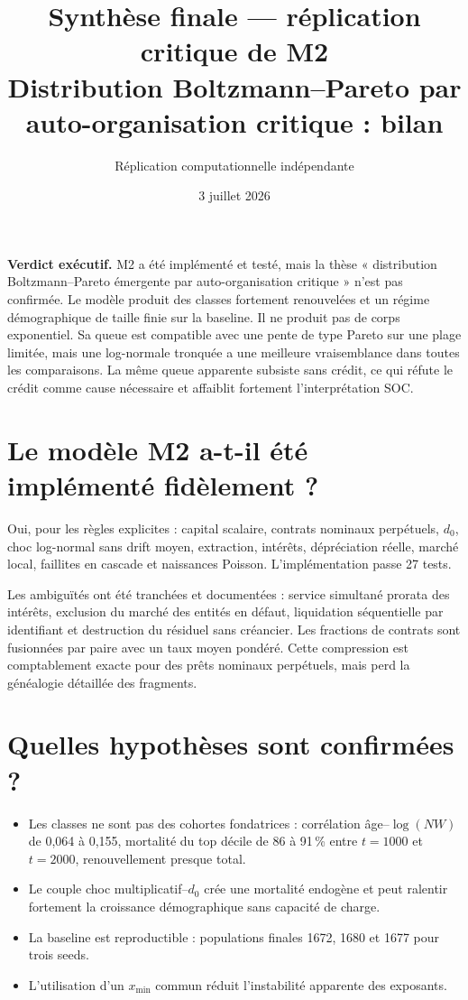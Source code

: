\documentclass[11pt,a4paper]{article}
\title{Synthèse finale — réplication critique de M2\\
\large Distribution Boltzmann--Pareto par auto-organisation critique : bilan}
\author{Réplication computationnelle indépendante}
\date{3 juillet 2026}
\begin{document}
\maketitle

\begin{verdictbox}
\textbf{Verdict exécutif.} M2 a été implémenté et testé, mais la thèse
« distribution Boltzmann--Pareto émergente par auto-organisation critique »
n'est pas confirmée. Le modèle produit des classes fortement renouvelées et un
régime démographique de taille finie sur la baseline. Il ne produit pas de
corps exponentiel. Sa queue est compatible avec une pente de type Pareto sur
une plage limitée, mais une log-normale tronquée a une meilleure vraisemblance
dans toutes les comparaisons. La même queue apparente subsiste sans crédit, ce
qui réfute le crédit comme cause nécessaire et affaiblit fortement
l'interprétation SOC.
\end{verdictbox}

\tableofcontents

\section{Le modèle M2 a-t-il été implémenté fidèlement ?}

Oui, pour les règles explicites : capital scalaire, contrats nominaux
perpétuels, $d_0$, choc log-normal sans drift moyen, extraction, intérêts,
dépréciation réelle, marché local, faillites en cascade et naissances Poisson.
L'implémentation passe 27 tests.

Les ambiguïtés ont été tranchées et documentées : service simultané prorata
des intérêts, exclusion du marché des entités en défaut, liquidation
séquentielle par identifiant et destruction du résiduel sans créancier. Les
fractions de contrats sont fusionnées par paire avec un taux moyen pondéré.
Cette compression est comptablement exacte pour des prêts nominaux perpétuels,
mais perd la généalogie détaillée des fragments.

\section{Quelles hypothèses sont confirmées ?}

\begin{itemize}[leftmargin=1.4em]
  \item Les classes ne sont pas des cohortes fondatrices : corrélation
    âge--$\log(NW)$ de 0,064 à 0,155, mortalité du top décile de 86 à 91\,\%
    entre $t=1000$ et $t=2000$, renouvellement presque total.
  \item Le couple choc multiplicatif--$d_0$ crée une mortalité endogène et
    peut ralentir fortement la croissance démographique sans capacité de
    charge.
  \item La baseline est reproductible : populations finales 1672, 1680 et
    1677 pour trois seeds.
  \item L'utilisation d'un $x_{\min}$ commun réduit l'instabilité apparente
    des exposants.
\end{itemize}
\end{document}
